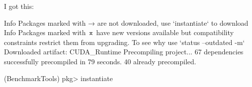 I got this:

        Info Packages marked with → are not downloaded, use `instantiate` to download
        Info Packages marked with ⌅ have new versions available but compatibility constraints restrict them from upgrading. To see why use `status --outdated -m`
  Downloaded artifact: CUDA_Runtime
Precompiling project...
  67 dependencies successfully precompiled in 79 seconds. 40 already precompiled.

(BenchmarkTools) pkg> instantiate


